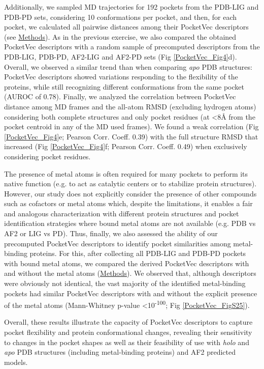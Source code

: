 Additionally, we sampled MD trajectories for 192 pockets from the PDB-LIG and PDB-PD sets, considering 10 conformations per pocket, and then, for each pocket, we calculated all pairwise distances among their PocketVec descriptors (see \hyperref[PocketVec_Methods]{Methods}). As in the previous exercise, we also compared the obtained PocketVec descriptors with a random sample of precomputed descriptors from the PDB-LIG, PDB-PD, AF2-LIG and AF2-PD sets (Fig \ref{PocketVec_Fig4}d). Overall, we observed a similar trend than when comparing \textit{apo} PDB structures: PocketVec descriptors showed variations responding to the flexibility of the proteins, while still recognizing different conformations from the same pocket (AUROC of 0.78). Finally, we analyzed the correlation between PocketVec distance among MD frames and the all-atom RMSD (excluding hydrogen atoms) considering both complete structures and only pocket residues (at <8Å from the pocket centroid in any of the MD used frames). We found a weak correlation (Fig \ref{PocketVec_Fig4}e; Pearson Corr. Coeff. 0.39) with the full structure RMSD that increased (Fig \ref{PocketVec_Fig4}f; Pearson Corr. Coeff. 0.49) when exclusively considering pocket residues. 

The presence of metal atoms is often required for many pockets to perform its native function (e.g. to act as catalytic centers or to stabilize protein structures). However, our study does not explicitly consider the presence of other compounds such as cofactors or metal atoms which, despite the limitations, it enables a fair and analogous characterization with different protein structures and pocket identification strategies where bound metal atoms are not available (e.g. PDB vs AF2 or LIG vs PD). Thus, finally, we also assessed the ability of our precomputed PocketVec descriptors to identify pocket similarities among metal-binding proteins. For this, after collecting all PDB-LIG and PDB-PD pockets with bound metal atoms, we compared the derived PocketVec descriptors with and without the metal atoms (\hyperref[PocketVec_Methods]{Methods}). We observed that, although descriptors were obviously not identical, the vast majority of the identified metal-binding pockets had similar PocketVec descriptors with and without the explicit presence of the metal atoms (Mann-Whitney p-value <10\textsuperscript{-100}; Fig \ref{PocketVec_FigS25}). 

Overall, these results illustrate the capacity of PocketVec descriptors to capture pocket flexibility and protein conformational changes, revealing their sensitivity to changes in the pocket shapes as well as their feasibility of use with \textit{holo} and \textit{apo} PDB structures (including metal-binding proteins) and AF2 predicted models. 


